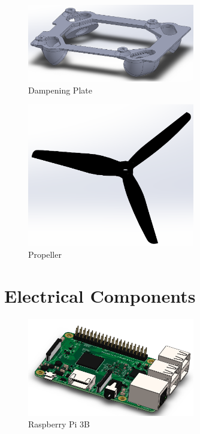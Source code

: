\documentclass[12pt, titlepage]{article}
\begin{document}
\begin{figure}[h!]
  \begin{center} 
  \caption{Dampening Plate}
  \label{Dampening Plate}
        \includegraphics[width=0.65\textwidth]{CAD_DampenerTop.png}
  \end{center}
\end{figure}

\begin{figure}[h!]
  \begin{center} 
  \caption{Propeller}
  \label{Propeller}
        \includegraphics[width=0.65\textwidth]{CAD_Propeller.png}
  \end{center}
\end{figure}

\clearpage

\section{Electrical Components}

\begin{figure}[h!]
  \begin{center} 
  \caption{Raspberry Pi 3B}
  \label{Raspberry Pi 3B}
        \includegraphics[width=0.65\textwidth]{CAD_RPi3B.png}
  \end{center}
\end{figure}
\end{document}
